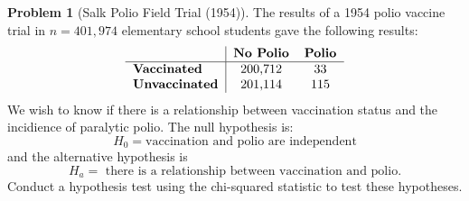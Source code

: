 \documentclass[10pt]{article}
\theoremstyle{definition}
\newtheorem{problem}[theorem]{Problem}
\newcommand{\1}[1]{\textbf{1}_{\left[#1\right]}} %
\begin{document}
\begin{problem}[Salk Polio Field Trial (1954)]
  \label{ex:salk-polio-field-trial-1954}
  The results of a 1954 polio vaccine trial in $n=401,974$ elementary school
  students gave the following results:
  \begin{equation}\label{eq:table-of-observed-values}
    \begin{tabular}{l|cc}
      & \textbf{No Polio} & \textbf{Polio} \\
      \hline
      \textbf{Vaccinated} & 200,712          & 33            \\
      \textbf{Unvaccinated}  & 201,114           & 115           
    \end{tabular} 
  \end{equation}
  We wish to know if there is a relationship between vaccination status and
  the incidience of paralytic polio. The null hypothesis is:
  \begin{equation*}
    H_{0}= \text{vaccination and polio are independent}
  \end{equation*}
  and the alternative hypothesis is
  \begin{equation*}
    H_{a} = \text{ there is a relationship between vaccination and polio.}
  \end{equation*}
  Conduct a hypothesis test using the chi-squared statistic to test these
  hypotheses.
\end{problem}
\end{document}
